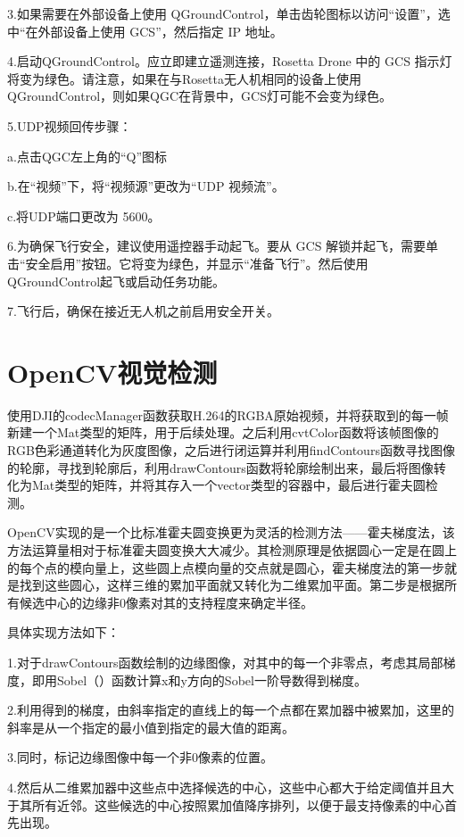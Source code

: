 3.如果需要在外部设备上使用 QGroundControl，单击齿轮图标以访问“设置”，选中“在外部设备上使用 GCS”，然后指定 IP 地址。

4.启动QGroundControl。应立即建立遥测连接，Rosetta Drone 中的 GCS 指示灯将变为绿色。请注意，如果在与Rosetta无人机相同的设备上使用QGroundControl，则如果QGC在背景中，GCS灯可能不会变为绿色。

5.UDP视频回传步骤：

a.点击QGC左上角的“Q”图标

b.在“视频”下，将“视频源”更改为“UDP 视频流”。

c.将UDP端口更改为 5600。

6.为确保飞行安全，建议使用遥控器手动起飞。要从 GCS 解锁并起飞，需要单击“安全启用”按钮。它将变为绿色，并显示“准备飞行”。然后使用QGroundControl起飞或启动任务功能。

7.飞行后，确保在接近无人机之前启用安全开关。

\section{OpenCV视觉检测}

使用DJI的codecManager函数获取H.264的RGBA原始视频，并将获取到的每一帧新建一个Mat类型的矩阵，用于后续处理。之后利用cvtColor函数将该帧图像的RGB色彩通道转化为灰度图像，之后进行闭运算并利用findContours函数寻找图像的轮廓，寻找到轮廓后，利用drawContours函数将轮廓绘制出来，最后将图像转化为Mat类型的矩阵，并将其存入一个vector类型的容器中，最后进行霍夫圆检测。

OpenCV实现的是一个比标准霍夫圆变换更为灵活的检测方法——霍夫梯度法，该方法运算量相对于标准霍夫圆变换大大减少。其检测原理是依据圆心一定是在圆上的每个点的模向量上，这些圆上点模向量的交点就是圆心，霍夫梯度法的第一步就是找到这些圆心，这样三维的累加平⾯就又转化为二维累加平面。第二步是根据所有候选中心的边缘非0像素对其的支持程度来确定半径。

具体实现方法如下：

1.对于drawContours函数绘制的边缘图像，对其中的每一个非零点，考虑其局部梯度，即用Sobel（）函数计算x和y方向的Sobel⼀阶导数得到梯度。

2.利用得到的梯度，由斜率指定的直线上的每一个点都在累加器中被累加，这⾥的斜率是从一个指定的最小值到指定的最大值的距离。

3.同时，标记边缘图像中每一个非0像素的位置。

4.然后从二维累加器中这些点中选择候选的中心，这些中心都大于给定阈值并且大于其所有近邻。这些候选的中心按照累加值降序排列，以便于最支持像素的中心首先出现。

